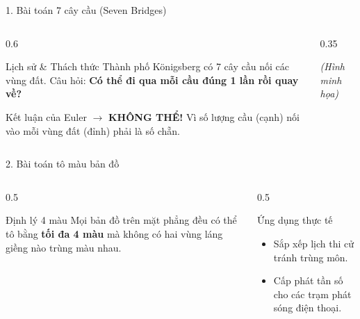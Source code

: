 \documentclass[11pt]{beamer}
\newenvironment{mainbox}[1]{\begin{block}{#1}}{\end{block}}
\newenvironment{highlightbox}[1]{\begin{alertblock}{#1}}{\end{alertblock}}
\begin{document}
\begin{frame}{1. Bài toán 7 cây cầu (Seven Bridges)}
    \begin{columns}[T]
        \begin{column}{0.6\textwidth}
            \begin{mainbox}{Lịch sử \& Thách thức}
                Thành phố Königsberg có 7 cây cầu nối các vùng đất. Câu hỏi: \textbf{Có thể đi qua mỗi cầu đúng 1 lần rồi quay về?}
            \end{mainbox}
            \vspace{0.3cm}
            \begin{highlightbox}{Kết luận của Euler}
                $\rightarrow$ \textbf{KHÔNG THỂ!} 
                Vì số lượng cầu (cạnh) nối vào mỗi vùng đất (đỉnh) phải là số chẵn.
            \end{highlightbox}
        \end{column}
        \begin{column}{0.35\textwidth}
            \begin{center}
                \textit{(Hình minh họa)} \\
            \end{center}
        \end{column}
    \end{columns}
\end{frame}

\begin{frame}{2. Bài toán tô màu bản đồ}
    \begin{columns}[T]
        \begin{column}{0.5\textwidth}
            \begin{mainbox}{Định lý 4 màu}
                Mọi bản đồ trên mặt phẳng đều có thể tô bằng \textbf{tối đa 4 màu} mà không có hai vùng láng giềng nào trùng màu nhau.
            \end{mainbox}
        \end{column}
        \begin{column}{0.5\textwidth}
            \begin{highlightbox}{Ứng dụng thực tế}
                \begin{itemize}
                    \item Sắp xếp lịch thi cử tránh trùng môn.
                    \item Cấp phát tần số cho các trạm phát sóng điện thoại.
                \end{itemize}
            \end{highlightbox}
        \end{column}
    \end{columns}
\end{frame}
\end{document}
